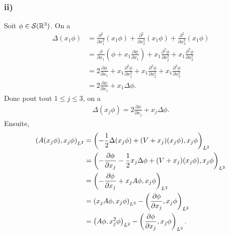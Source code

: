 \subsubsection*{ii)}

Soit $\phi \in \mathcal{S}(\mathbb{R}^3)$. On a
\begin{align}
    \Delta(x_1 \phi)
    &= \frac{\partial^2}{\partial x_1^2}(x_1 \phi)
    + \frac{\partial^2}{\partial x_2^2}(x_1 \phi)
    + \frac{\partial^2}{\partial x_3^2}(x_1 \phi) \\
    &= \frac{\partial}{\partial x_1}
    \left (\phi + x_1 \frac{\partial \phi}{\partial x_1} \right)
    + x_1 \frac{\partial^2 \phi}{\partial x_2^2}
    + x_1 \frac{\partial^2 \phi}{\partial x_3^2} \\
    &= 2 \frac{\partial \phi}{\partial x_1}
    + x_1 \frac{\partial^2 \phi}{\partial x_1^2}
    + x_1 \frac{\partial^2 \phi}{\partial x_2^2}
    + x_1 \frac{\partial^2 \phi}{\partial x_3^2} \\
    &= 2 \frac{\partial \phi}{\partial x_1}
    + x_1 \Delta \phi.
\end{align}
%
Donc pout tout $1 \leqslant j \leqslant 3$, on a
\begin{align}
    \Delta(x_j \phi) = 2 \frac{\partial \phi}{\partial x_j}
    + x_j \Delta \phi.
\end{align}
%
Ensuite,
\begin{align}
    \left( A(x_j \phi), x_j \phi \right)_{L^2}
    &= \left( -\frac{1}{2} \Delta(x_j \phi) + (V + x_j)(x_j \phi), x_j \phi \right)_{L^2} \\
    &= \left( -\frac{\partial \phi}{\partial x_j}
        - \frac{1}{2} x_j \Delta \phi + (V + x_j)(x_j \phi), x_j \phi \right)_{L^2} \\
    &= \left( -\frac{\partial \phi}{\partial x_j}
        + x_j A \phi, x_j \phi \right)_{L^2} \\
    &= \left( x_j A \phi, x_j \phi \right)_{L^2}
     -\left( \frac{\partial \phi}{\partial x_j}, x_j \phi \right)_{L^2}\\
    &= \left( A \phi, x_j^2 \phi \right)_{L^2}
    -\left( \frac{\partial \phi}{\partial x_j}, x_j \phi \right)_{L^2}.
\end{align}

